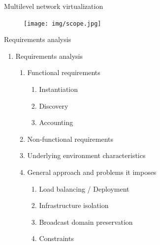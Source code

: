 \documentclass{beamer}
\begin{document}
\setcounter{enumi_chapter}{\value{enumi}}

\begin{frame}{Multilevel network virtualization}
		
	\begin{figure}[H]
		\texttt{[image: img/scope.jpg]}
	\end{figure}

\end{frame}

\setcounter{enumi_chapter}{\value{enumi}}


\begin{frame}{Requirements analysis}

	\begin{enumerate}
		\setcounter{enumi}{\value{enumi_chapter}}

		\item Requirements analysis

			\begin{enumerate}

				\item Functional requirements

					\begin{enumerate}
						\item Instantiation
						\item Discovery
						\item Accounting
					\end{enumerate}

					\pause
			
			 \item Non-functional requirements \pause

			 \item Underlying environment characteristics \pause
		 
			 \item General approach and problems it imposes

			 	\begin{enumerate}
					\item Load balancing / Deployment
					\item Infrastructure isolation
					\item Broadcast domain preservation
					\item Constraints
				\end{enumerate}
		 
			\end{enumerate}

	\end{enumerate}

\end{frame}
\end{document}
